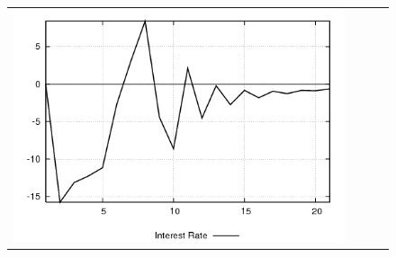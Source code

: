\begin{figure}
\begin{tabular}{cccc}
\includegraphics[scale=0.22]{results_wlsinit/Interest_Rate_mpshock_irf.png} \\ 
\end{tabular}
\end{figure}
